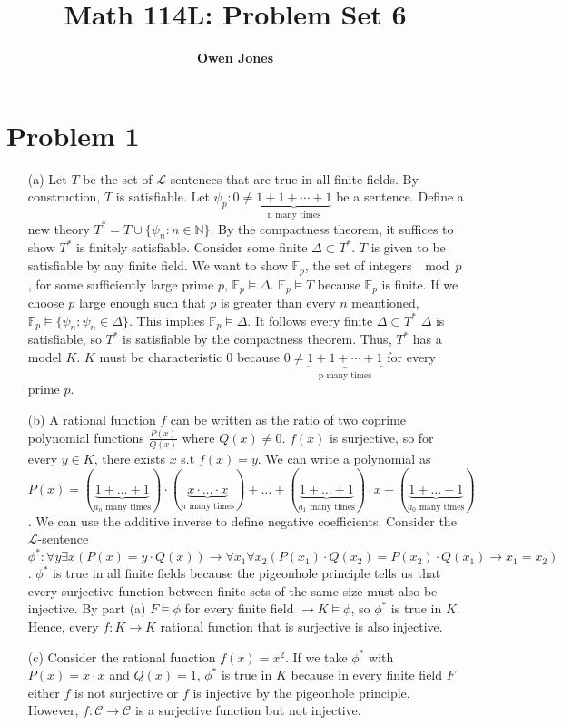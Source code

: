 \documentclass[10pt]{article}
\title{\bf Math 114L\@: Problem Set 6}
\author{\bf Owen Jones}
\begin{document}
\maketitle
\section*{Problem 1}
\begin{itemize}
    \item [(a)] Let $T$ be the set of $\mathcal{L}$-sentences that are true in all finite fields. 
    By construction, $T$ is satisfiable. 
    Let $\psi_p:0\neq \underbrace{1+1+\cdots+1}_\text{n many times}$ be a sentence. 
    Define a new theory $T^*=T\cup\{\psi_n:n\in\mathbb{N}\}$.
    By the compactness theorem, it suffices to show $T^*$ is finitely satisfiable.
    Consider some finite $\Delta\subset T^*$. $T$ is given to be satisfiable by any finite field. 
    We want to show $\mathbb{F}_p$, the set of integers $\mod p$, for some sufficiently large prime $p$, $\mathbb{F}_p\models\Delta$.
    $\mathbb{F}_p\models T$ because $\mathbb{F}_p$ is finite. 
    If we choose $p$ large enough such that $p$ is greater than every $n$ meantioned, $\mathbb{F}_p\models\{\psi_{n}: \psi_{n}\in\Delta\}$. 
    This implies $\mathbb{F}_p\models\Delta$.
    It follows every finite $\Delta\subset T^*$ $\Delta$ is satisfiable, so $T^*$ is satisfiable by the compactness theorem.
    Thus, $T^*$ has a model $K$.
    $K$ must be characteristic $0$ because $0\neq \underbrace{1+1+\cdots+1}_\text{p many times}$ for every prime $p$.
    \item [(b)] A rational function $f$ can be written as the ratio of two coprime polynomial functions $\frac{P(x)}{Q(x)}$ where $Q(x)\neq 0$.
    $f(x)$ is surjective, so for every $y\in K$, there exists $x$ s.t $f(x)=y$.
    We can write a polynomial as $P(x)=(\underbrace{1+\ldots+1}_{a_n\text{ many times}})\cdot (\underbrace{x\cdot \ldots \cdot x}_{n\text{ many times}})+\ldots +(\underbrace{1+\ldots+1}_{a_1\text{ many times}})\cdot x+(\underbrace{1+\ldots+1}_{a_0\text{ many times}})$.
    We can use the additive inverse to define negative coefficients. 
    Consider the $\mathcal{L}$-sentence $\phi^*:\forall y\exists x(P(x)=y\cdot Q(x))\rightarrow \forall x_1\forall x_2(P(x_1)\cdot Q(x_2)=P(x_2)\cdot Q(x_1)\rightarrow x_1=x_2)$.
    $\phi^*$ is true in all finite fields because the pigeonhole principle tells us that every surjective function between finite sets of the same size must also be injective.
    By part (a) $F\models\phi$ for every finite field $\rightarrow K\models\phi$, so $\phi^*$ is true in $K$.
    Hence, every $f:K\rightarrow K$ rational function that is surjective is also injective.
    \item [(c)] Consider the rational function $f(x)=x^2$. 
    If we take $\phi^*$ with $P(x)=x\cdot x$ and $Q(x)=1$, $\phi^*$ is true in $K$ because in every finite field $F$ either $f$ is not surjective or $f$ is injective by the pigeonhole principle.
    However, $f:\mathcal{C}\rightarrow\mathcal{C}$ is a surjective function but not injective. 
\end{itemize}
\end{document}
